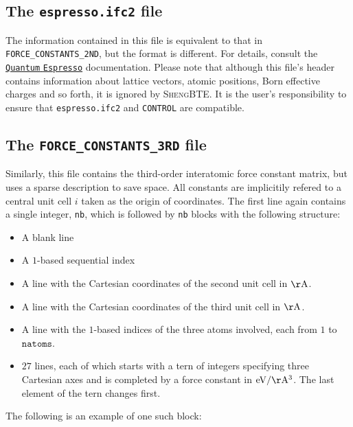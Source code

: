 \documentclass[a4paper,10pt,english]{article}
\begin{document}
\subsection{The \texttt{espresso.ifc2} file}

The information contained in this file is equivalent to that in \texttt{FORCE\_CONSTANTS\_2ND}, but the format is different. For details, consult the \href{http://www.quantum-espresso.org/}{\nolinkurl{Quantum} \nolinkurl{Espresso}} documentation. Please note that although this file's header contains information about lattice vectors, atomic positions, Born effective charges and so forth, it is ignored by \textsc{ShengBTE}. It is the user's responsibility to ensure that \texttt{espresso.ifc2} and \texttt{CONTROL} are compatible.

\subsection{The \texttt{FORCE\_CONSTANTS\_3RD} file}

Similarly, this file contains the third-order interatomic force constant matrix, but uses a sparse description to save space. All constants are implicitily refered to a central unit cell $i$ taken as the origin of coordinates. The first line again contains a single integer, \texttt{nb}, which is followed by \texttt{nb} blocks with the following structure:

\begin{itemize}
\item A blank line
\item A $1$-based sequential index
\item A line with the Cartesian coordinates of the second unit cell in $\mathrm{\AA}$.
\item A line with the Cartesian coordinates of the third unit cell in $\mathrm{\AA}$.
\item A line with the $1$-based indices of the three atoms involved, each from $1$ to $\mathtt{natoms}$.
\item $27$ lines, each of which starts with a tern of integers specifying three Cartesian axes and is completed by a force constant in $\mathrm{eV/\AA^3}$. The last element of the tern changes first.
\end{itemize}

The following is an example of one such block:
\end{document}
